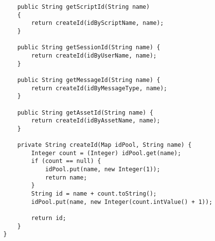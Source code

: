 \begin{verbatim}
	public String getScriptId(String name) 
	{
		return createId(idByScriptName, name);
	}
	
	public String getSessionId(String name)	{
		return createId(idByUserName, name);
	}

	public String getMessageId(String name)	{
		return createId(idByMessageType, name);
	}
	
	public String getAssetId(String name) {
		return createId(idByAssetName, name);
	}

	private String createId(Map idPool, String name) {
		Integer count = (Integer) idPool.get(name);
		if (count == null) {
			idPool.put(name, new Integer(1));
			return name;
		}
		String id = name + count.toString();
		idPool.put(name, new Integer(count.intValue() + 1));

		return id;
	}
}

\end{verbatim}
